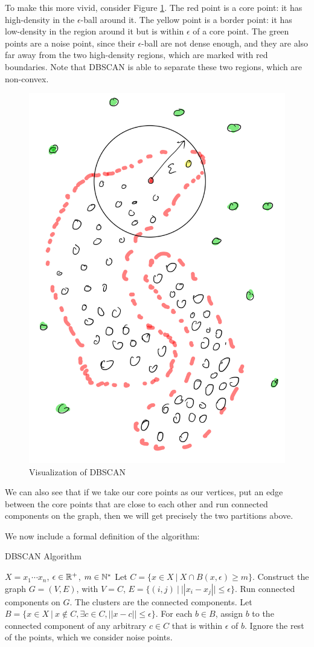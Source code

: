   To make this more vivid, consider Figure \ref{fig:dbscan}. The red point is a core point:
  it has high-density in the $\epsilon$-ball around it. The yellow point is a border
  point: it has low-density in the region around it but is within $\epsilon$ of
  a core point. The green points are a noise point, since their $\epsilon$-ball
  are not dense enough, and they are also far away from the two high-density
  regions, which are marked with red boundaries. Note that DBSCAN is able
  to separate these two regions, which are non-convex.

  \begin{figure}[h]
  \centering
  \includegraphics[width=.4\linewidth]{chapter_2/files/dbscan.png}
  \caption{Visualization of DBSCAN}
  \label{fig:dbscan}
  \end{figure}

  We can also see that if we take our core points as our vertices, put an edge between
  the core points that are close to each other and run connected components on
  the graph, then we will get precisely the two partitions above.

  We now include a formal definition of the algorithm:

  \begin{algorithm}[H]
    \caption{DBSCAN Algorithm}
    \label{dbscan alg}
    \begin{algorithmic}[1]
      \renewcommand\algorithmicrequire{\textbf{input}} 
      \REQUIRE $X = {x_1\cdots x_n}$, $\epsilon \in \mathbb{R}^+$, $m \in \mathbb{N}^*$   
      \STATE Let $C=\{x \in X \ | \ X \cap B(x, \epsilon) \geq m\}$.
      \STATE Construct the graph $G=(V,E)$, with $V=C$, $E=\{(i,j) \ | \ ||x_i-x_j|| \leq \epsilon\}$.
      \STATE Run connected components on $G$. The clusters are the connected components.
      \STATE Let $B=\{x \in X \ | \ x \notin C, \exists c \in C, ||x-c|| \leq \epsilon\}$.
      For each $b \in B$, assign $b$ to the connected component of any arbitrary $c \in C$
      that is within $\epsilon$ of $b$.
      \STATE Ignore the rest of the points, which we consider noise points.
    \end{algorithmic}
  \end{algorithm}


